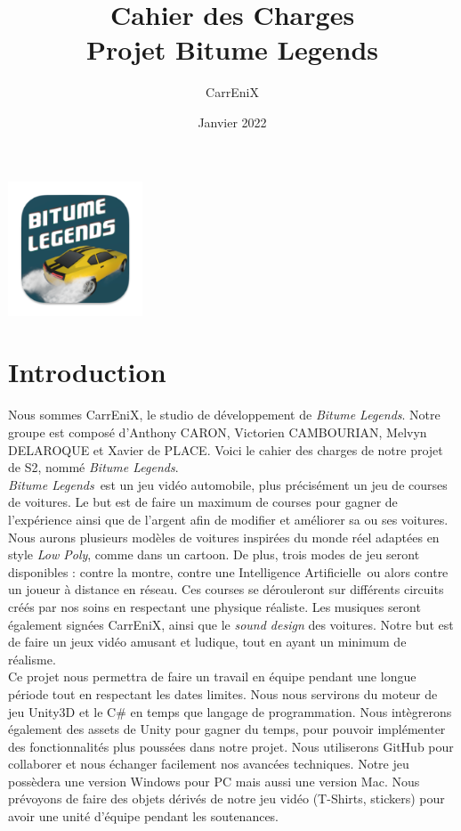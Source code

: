 \documentclass[11pt,a4paper]{article}
\newcommand{\btmlgs}{\textit{Bitume Legends}}
\newcommand{\AI}{Intelligence Artificielle}
\newcommand{\CEX}{CarrEniX}
\begin{document}
\title{Cahier des Charges \\ {\large Projet Bitume Legends}}
\author{CarrEniX}
\date{Janvier 2022}
\maketitle

\begin{center}
  \includegraphics[width=0.3\textwidth]{Medias/logo192.png}
\end{center}

\tableofcontents
\clearpage

\section{Introduction}

  Nous sommes \CEX, le studio de développement de \btmlgs. Notre groupe est composé d'Anthony CARON, 
  Victorien CAMBOURIAN, Melvyn DELAROQUE et Xavier de PLACE. Voici le cahier des charges de notre projet
  de S2, nommé \btmlgs.\\
  
  \btmlgs\, est un jeu vidéo automobile, plus précisément un jeu de courses de voitures. Le but est 
  de faire un maximum de courses pour gagner de l'expérience ainsi que de l'argent afin de
  modifier et améliorer sa ou ses voitures.
  Nous aurons plusieurs modèles de voitures inspirées du monde réel adaptées en style \textit{Low Poly},
  comme dans un cartoon. De plus, trois modes de jeu seront disponibles : contre la montre, contre une \AI\,
  ou alors contre un joueur à distance en réseau. Ces courses se dérouleront sur différents circuits créés 
  par nos soins en respectant une physique réaliste.
  Les musiques seront également signées \CEX, ainsi que le \textit{sound design} des voitures.
  Notre but est de faire un jeux vidéo amusant et ludique, tout en ayant un minimum de réalisme.\\
  
  Ce projet nous permettra de faire un travail en équipe pendant une longue période tout en respectant les dates limites.
  Nous nous servirons du moteur de jeu Unity3D et le C\# en temps que langage de programmation. Nous intègrerons 
  également des assets de Unity pour gagner du temps, pour pouvoir implémenter des fonctionnalités plus poussées dans notre projet.
  Nous utiliserons GitHub pour collaborer et nous échanger facilement nos avancées techniques.
  Notre jeu possèdera une version Windows pour PC mais aussi une version Mac.
  Nous prévoyons de faire des objets dérivés de notre jeu vidéo (T-Shirts, stickers) pour avoir une unité d'équipe 
  pendant les soutenances.\\
  
\end{document}
